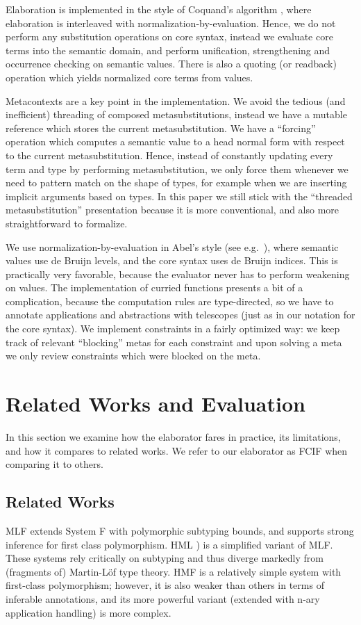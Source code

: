 \documentclass[acmsmall,review,anonymous,prologue,dvipsnames]{acmart}\settopmatter{printfolios=true,printccs=false,printacmref=false}
\theoremstyle{remark}
\begin{document}
Elaboration is implemented in the style of Coquand's algorithm
\cite{coquand1996algorithm}, where elaboration is interleaved with
normalization-by-evaluation. Hence, we do not perform any substitution
operations on core syntax, instead we evaluate core terms into the semantic
domain, and perform unification, strengthening and occurrence checking on
semantic values. There is also a quoting (or readback) operation which yields
normalized core terms from values.

Metacontexts are a key point in the implementation. We avoid the tedious (and
inefficient) threading of composed metasubstitutions, instead we have a mutable
reference which stores the current metasubstitution. We have a ``forcing''
operation which computes a semantic value to a head normal form with respect to
the current metasubstitution. Hence, instead of constantly updating every term
and type by performing metasubstitution, we only force them whenever we need to
pattern match on the shape of types, for example when we are inserting implicit
arguments based on types. In this paper we still stick with the ``threaded
metasubstitution'' presentation because it is more conventional, and also more
straightforward to formalize.

We use normalization-by-evaluation in Abel's style (see
e.g.\ \cite[Chapter~3]{abel2013normalization}), where semantic values use de
Bruijn levels, and the core syntax uses de Bruijn indices. This is practically
very favorable, because the evaluator never has to perform weakening on values.
The implementation of curried functions presents a bit of a complication,
because the computation rules are type-directed, so we have to annotate
applications and abstractions with telescopes (just as in our notation for the
core syntax). We implement constraints in a fairly optimized way: we keep track
of relevant ``blocking'' metas for each constraint and upon solving a meta we
only review constraints which were blocked on the meta.

\section{Related Works and Evaluation}
\label{sec:impl_and_eval}

In this section we examine how the elaborator fares in practice, its
limitations, and how it compares to related works. We refer to our elaborator as
FCIF when comparing it to others.

\subsection{Related Works}
MLF \cite{le2014mlf} extends System F with polymorphic subtyping
bounds, and supports strong inference for first class polymorphism. HML
\cite{leijen2009flexible}) is a simplified variant of MLF. These systems rely
critically on subtyping and thus diverge markedly from (fragments of) Martin-L\"of
type theory. HMF \cite{leijen2008hmf} is a relatively simple system with
first-class polymorphism; however, it is also weaker than others in terms of
inferable annotations, and its more powerful variant (extended with n-ary
application handling) is more complex.
\end{document}
